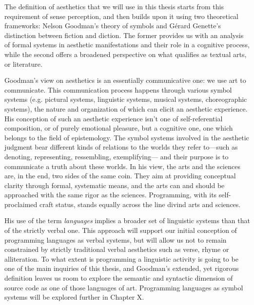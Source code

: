 The definition of aesthetics that we will use in this thesis starts from this requirement of sense perception, and then builds upon it using two theoretical frameworks: Nelson Goodman's theory of symbols\cite{goodman_languages_1976} and Gérard Genette's distinction between fiction and diction\cite{genette_fiction_1993}. The former provides us with an analysis of formal systems in aesthetic manifestations and their role in a cognitive process, while the second offers a broadened perspective on what qualifies as textual arts, or literature.

Goodman's view on aesthetics is an essentially communicative one: we use art to communicate. This communication process happens through various symbol systems (e.g. pictural systems, linguistic systems, musical systems, choreographic systems), the nature and organization of which can elicit an aesthetic experience. His conception of such an aesthetic experience isn't one of self-referential composition, or of purely emotional pleasure, but a cognitive one, one which belongs to the field of epistemology\cite{goodman_languages_1976}. The symbol systems involved in the aesthetic judgment bear different kinds of relations to the worlds they refer to—such as denoting, representing, ressembling, exemplifying— and their purpose is to communicate a truth about these worlds\cite{nelson_goodman_ways_1978}. In his view, the arts and the sciences are, in the end, two sides of the same coin. They aim at providing conceptual clarity through formal, systematic means, and the arts can and should be approached with the same rigor as the sciences. Programming, with its self-proclaimed craft status, stands equally across the line divind arts and sciences.

His use of the term \emph{languages} implies a broader set of linguistic systems than that of the strictly verbal one. This approach will support our initial conception of programming languages as verbal systems, but will allow us not to remain constrained by strictly traditional verbal aesthetics such as verse, rhyme or alliteration. To what extent is programming a linguistic activity is going to be one of the main inquiries of this thesis, and Goodman's extended, yet rigorous definition leaves us room to explore the semantic and syntactic dimension of source code as one of those languages of art. Programming languages as symbol systems will be explored further in Chapter X.


